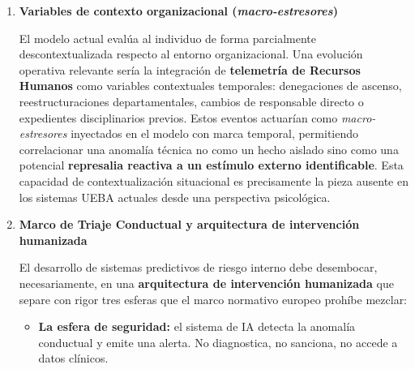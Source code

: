 \documentclass[IB]{TFUOC}%
\begin{document}
\begin{enumerate}
    El análisis de sentimiento polarizado actual (\textit{Z-Score} VADER) es operativamente eficaz pero semánticamente superficial. 
    Proponemos la evolución del módulo de Procesamiento de Lenguaje Natural (NLP) hacia arquitecturas de de modelos grandes LLM fundamentadas en la \textbf{Teoría de los Marcos Relacionales} (Hayes et al., 2001, 2016), marco teórico subyacente a la Terapia de 
    Aceptación y Compromiso (ACT). Aplicada al análisis de texto corporativo, la RFT permitiría trascender la detección de polaridad léxica para inferir cómo el empleado \textbf{enmarca cognitivamente su relación de identidad con la organización}: patrones de alienación progresiva (``nosotros vs. ellos''), disonancia entre esfuerzo percibido y reconocimiento recibido, o erosión del compromiso organizacional. Estos constructos corresponden exactamente a la fase de ``ideación'' del modelo CPIR, que el análisis de sentimiento actual solo aproxima de forma indirecta.

    \item \textbf{Variables de contexto organizacional 
    (\textit{macro-estresores})}
    
    El modelo actual evalúa al individuo de forma parcialmente descontextualizada respecto al entorno organizacional. Una evolución operativa relevante sería la integración de \textbf{telemetría de Recursos Humanos} como variables contextuales temporales: denegaciones de ascenso, reestructuraciones departamentales, cambios de responsable 
    directo o expedientes disciplinarios previos. Estos eventos actuarían como \textit{macro-estresores} inyectados en el modelo con marca temporal, permitiendo correlacionar una 
    anomalía técnica no como un hecho aislado sino como una potencial \textbf{represalia reactiva a un estímulo externo identificable}. Esta capacidad de contextualización 
    situacional es precisamente la pieza ausente en los sistemas UEBA actuales desde una perspectiva psicológica.

    \item \textbf{Marco de Triaje Conductual y arquitectura de intervención humanizada}
    
    El desarrollo de sistemas predictivos de riesgo interno debe desembocar, necesariamente, en una \textbf{arquitectura de intervención humanizada} que separe con rigor tres esferas 
    que el marco normativo europeo prohíbe mezclar:

    \begin{itemize}
        \item \textbf{La esfera de seguridad:} el sistema de IA detecta la anomalía conductual y emite una alerta. No diagnostica, no sanciona, no accede a datos clínicos.
        

\end{itemize}
\end{enumerate}
\end{document}
